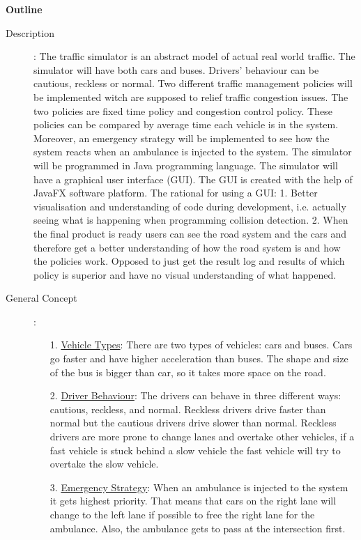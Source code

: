 \documentclass[11pt]{article}
\begin{document}
\textbf{Outline}
\begin{description}
\item[Description]:
The traffic simulator is an abstract model of actual real world traffic. The simulator will have both cars and buses. Drivers' behaviour can be cautious, reckless or normal. Two different traffic management policies will be implemented witch are supposed to relief traffic congestion issues. The two policies are fixed time policy and congestion control policy. These policies can be compared by average time each vehicle is in the system. Moreover, an emergency strategy will be implemented to see how the system reacts when an ambulance is injected to the system. 
\newline
The simulator will be programmed in Java programming language. The simulator will have a graphical user interface (GUI). The GUI is created with the help of JavaFX software platform. The rational for using a GUI: 1. Better visualisation and understanding of code during development, i.e. actually seeing what is happening when programming collision detection. 2. When the final product is ready users can see the road system and the cars and therefore get a better understanding of how the road system is and how the policies work. Opposed to just get the result log and results of which policy is superior and have no visual understanding of what happened. 
\item[General Concept]:
	\begin{itemize}
		\item[1. ]\underline{Vehicle Types}: There are two types of vehicles: cars and buses. Cars go faster and have higher acceleration than buses. The shape and size of the bus is bigger than car, so it takes more space on the road.
		
		\item[2. ] \underline{Driver Behaviour}: The drivers can behave in three different ways: cautious, reckless, and normal. Reckless drivers drive faster than normal but the cautious drivers drive slower than normal. Reckless drivers are more prone to change lanes and overtake other vehicles, if a fast vehicle is stuck behind a slow vehicle the fast vehicle will try to overtake the slow vehicle.

		\item[3. ] \underline{Emergency Strategy}: When an ambulance is injected to the system it gets highest priority. That means that cars on the right lane will change to the left lane if possible to free the right lane for the ambulance. Also, the ambulance gets to pass at the intersection first.


\end{itemize}
\end{description}
\end{document}
